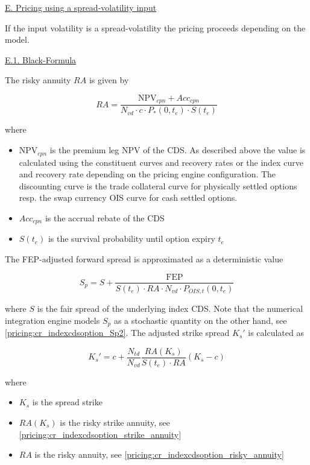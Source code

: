 \underline{E. Pricing using a spread-volatility input}

If the input volatility is a spread-volatility the pricing proceeds depending on the model.

\underline{E.1. Black-Formula}

The risky annuity $RA$ is given by

\begin{equation}\label{pricing:cr_indexcdsoption_risky_annuity}
RA = \frac{\text{NPV}_{cpn} + Acc_{cpn}}{N_{vd} \cdot c \cdot P_{*}(0, t_e) \cdot S(t_e)}
\end{equation}

where

\begin{itemize}
\item $\text{NPV}_{cpn}$ is the premium leg NPV of the CDS. As described above the value is calculated using the
  constituent curves and recovery rates or the index curve and recovery rate depending on the pricing engine
  configuration. The discounting curve is the trade collateral curve for physically settled options resp. the swap
  currency OIS curve for cash settled options.
\item $Acc_{cpn}$ is the accrual rebate of the CDS
\item $S(t_e)$ is the survival probability until option expiry $t_e$
\end{itemize}

The FEP-adjusted forward spread is approximated as a deterministic value

\begin{equation}\label{pricing:cr_indexcdsoption_Sp}
S_p = S + \frac{\text{FEP}}{S(t_e) \cdot RA \cdot N_{vd} \cdot P_{OIS,t}(0,t_e)}
\end{equation}

where $S$ is the fair spread of the underlying index CDS. Note that the numerical integration engine models $S_p$ as a
stochastic quantity on the other hand, see \ref{pricing:cr_indexcdsoption_Sp2}. The adjusted strike spread $K_s'$
is calculated as


\begin{equation}
K_s' = c + \frac{N_{td}}{N_{vd}}\frac{RA(K_s)}{S(t_e) \cdot RA} \left( K_s - c \right)
\end{equation}

where

\begin{itemize}
\item $K_s$ is the spread strike
\item $RA(K_s)$ is the risky strike annuity, see \ref{pricing:cr_indexcdsoption_strike_annuity}
\item $RA$ is the risky annuity, see \ref{pricing:cr_indexcdsoption_risky_annuity}
\end{itemize}

